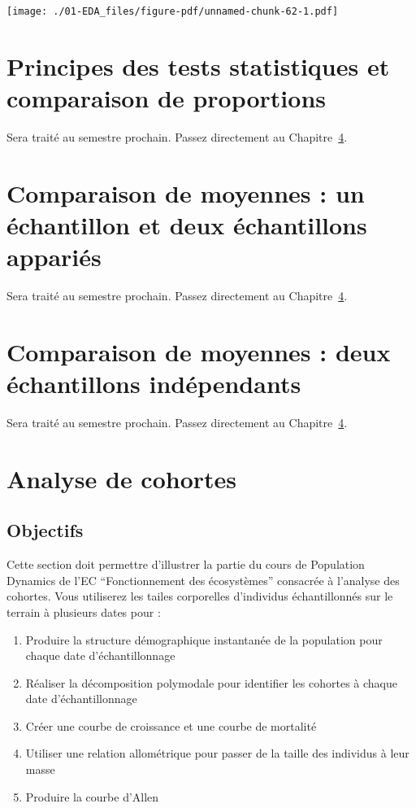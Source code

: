 \documentclass[
  a4paper,
  DIV=11,
  numbers=noendperiod,
  oneside]{scrreprt}
\providecommand{\tightlist}{%
  \setlength{\itemsep}{0pt}\setlength{\parskip}{0pt}}\usepackage{longtable,booktabs,array}
\begin{document}
\texttt{[image: ./01-EDA\_files/figure-pdf/unnamed-chunk-62-1.pdf]}


\hypertarget{sec-prop}{%
\chapter{Principes des tests statistiques et comparaison de
proportions}\label{sec-prop}}

Sera traité au semestre prochain. Passez directement au
Chapitre~\ref{sec-cohortes}.


\hypertarget{sec-moy1}{%
\chapter{Comparaison de moyennes : un échantillon et deux échantillons
appariés}\label{sec-moy1}}

Sera traité au semestre prochain. Passez directement au
Chapitre~\ref{sec-cohortes}.


\hypertarget{sec-moy2}{%
\chapter{Comparaison de moyennes : deux échantillons
indépendants}\label{sec-moy2}}

Sera traité au semestre prochain. Passez directement au
Chapitre~\ref{sec-cohortes}.


\hypertarget{sec-cohortes}{%
\chapter{Analyse de cohortes}\label{sec-cohortes}}

\hypertarget{objectifs-1}{%
\section{Objectifs}\label{objectifs-1}}

Cette section doit permettre d'illustrer la partie du cours de
Population Dynamics de l'EC ``Fonctionnement des écosystèmes'' consacrée
à l'analyse des cohortes. Vous utiliserez les tailes corporelles
d'individus échantillonnés sur le terrain à plusieurs dates pour :

\begin{enumerate}
\def\labelenumi{\arabic{enumi}.}
\tightlist
\item
  Produire la structure démographique instantanée de la population pour
  chaque date d'échantillonnage
\item
  Réaliser la décomposition polymodale pour identifier les cohortes à
  chaque date d'échantillonnage
\item
  Créer une courbe de croissance et une courbe de mortalité
\item
  Utiliser une relation allométrique pour passer de la taille des
  individus à leur masse
\item
  Produire la courbe d'Allen
\end{enumerate}
\end{document}
